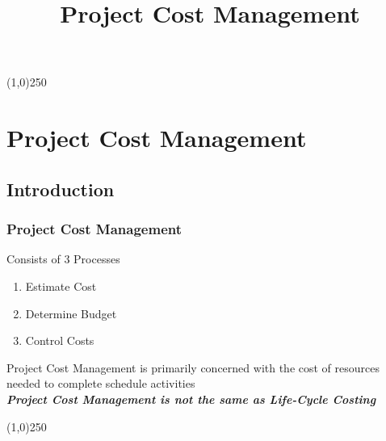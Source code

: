 


%
\title[Project Management]{Project Cost Management}



%

\tableofcontents
\newpage



\begin{frame}
\titlepage
\end{frame}
\begin{center}\line(1,0){250}\end{center}
%
%


\section{Project Cost Management}

\subsection{Introduction}


\begin{frame}
\frametitle{Project Cost Management}
Consists of 3 Processes\\
\begin{enumerate}
	\item Estimate Cost
	\item Determine Budget
	\item Control Costs
\end{enumerate}
Project Cost Management is primarily concerned with the cost of resources needed to complete schedule activities\\
\textbf\textit{Project Cost Management is not the same as Life-Cycle Costing}\\
\end{frame}
\begin{center}\line(1,0){250}\end{center}


